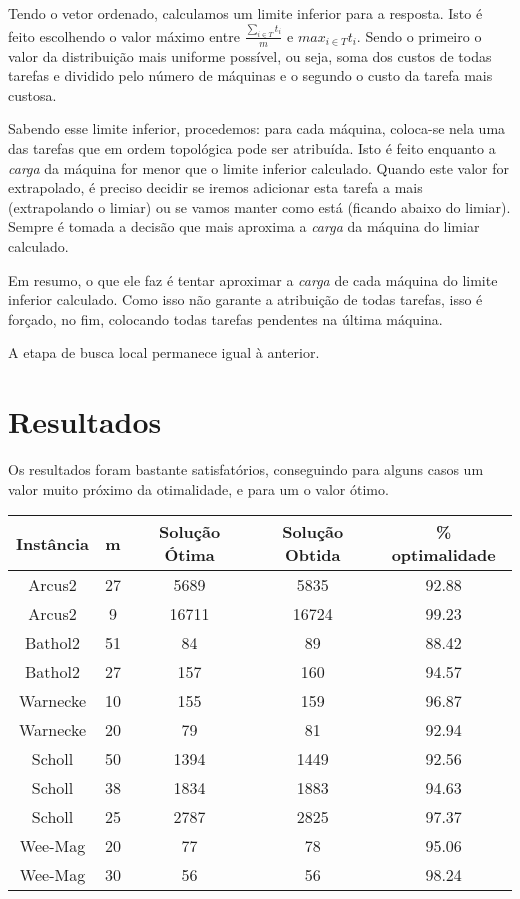 \documentclass{report}
\begin{document}
Tendo o vetor ordenado, calculamos um limite inferior para a
resposta. Isto é feito escolhendo o valor máximo entre $\frac{\sum_{i\in T}t_i}{m}$
 e $max_{i\in T}t_i$. Sendo o primeiro
o valor da distribuição mais uniforme possível, ou seja,
soma dos custos de todas tarefas e dividido pelo
número de máquinas e o segundo o custo da tarefa mais custosa.

Sabendo esse limite inferior, procedemos: para cada máquina, coloca-se
nela uma das tarefas que em ordem topológica pode ser atribuída.
Isto é feito enquanto a \emph{carga}
da máquina for menor que o limite inferior
calculado. Quando este valor for extrapolado, é preciso decidir se iremos
adicionar esta tarefa a mais
(extrapolando o limiar) ou se vamos manter como está (ficando abaixo do limiar).
Sempre é tomada a decisão que mais
aproxima a \emph{carga} da máquina do limiar calculado.

Em resumo, o que ele faz é tentar aproximar a \emph{carga} de
cada máquina do limite inferior calculado.
Como isso não garante a atribuição de todas tarefas, isso é forçado, no fim,
colocando todas tarefas pendentes na última máquina.

A etapa de busca local permanece igual à anterior.

\chapter{Resultados}

Os resultados foram bastante satisfatórios, conseguindo para alguns casos um
valor muito próximo da otimalidade, e para um o valor ótimo.

\begin{table}[htbp]
 \begin{tabular}{|c|c|c|c|c|}
  \hline
  \textbf{Instância} & \textbf{m} & \textbf{Solução Ótima} & \textbf{Solução Obtida} & \% optimalidade \\
  \hline
  Arcus2 & 27 & 5689 & 5835 & 92.88 \\
  \hline
  Arcus2 & 9 & 16711 & 16724 & 99.23 \\
  \hline
  Bathol2 & 51 & 84 & 89 & 88.42 \\
  \hline
  Bathol2 & 27 & 157 & 160 & 94.57 \\
  \hline
  Warnecke & 10 & 155 & 159 & 96.87 \\
  \hline
  Warnecke & 20 & 79 & 81 & 92.94 \\
  \hline
  Scholl & 50 & 1394 & 1449 & 92.56 \\
  \hline
  Scholl & 38 & 1834 & 1883 & 94.63 \\
  \hline
  Scholl & 25 & 2787 & 2825 & 97.37 \\
  \hline
  Wee-Mag & 20 & 77 & 78 & 95.06 \\
  \hline
  Wee-Mag & 30 & 56 & 56 & 98.24 \\
  \hline
 \end{tabular}
\end{table}
\end{document}
